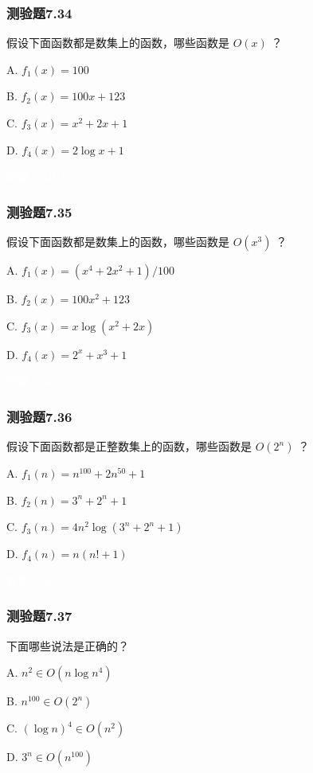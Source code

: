 \documentclass[UTF8, heading=true]{ctexart}
\begin{document}
\subsubsection{测验题7.34}

假设下面函数都是数集上的函数，哪些函数是 $O(x)$ ？

A. $f_1(x)=100$

B. $f_2(x)=100 x+123$

C. $f_3(x)=x^2+2 x+1$

D. $f_4(x)=2 \log x+1$

\textcolor{white}{答案：ABD}

\subsubsection{测验题7.35}

假设下面函数都是数集上的函数，哪些函数是 $O\left(x^3\right)$ ？

A. $f_1(x)=\left(x^4+2 x^2+1\right) / 100$

B. $f_2(x)=100 x^2+123$


C. $f_3(x)=x \log \left(x^2+2 x\right)$

D.  $f_4(x)=2^x+x^3+1$

\textcolor{white}{答案：BC}

\subsubsection{测验题7.36}

假设下面函数都是正整数集上的函数，哪些函数是 $O\left(2^n\right)$ ？

A. $f_1(n)=n^{100}+2 n^{50}+1$

B. $f_2(n)=3^n+2^n+1$

C. $f_3(n)=4 n^2 \log \left(3^n+2^n+1\right)$

D. $f_4(n)=n(n!+1)$

\textcolor{white}{答案：AC}


\subsubsection{测验题7.37}

下面哪些说法是正确的？

A. $ n^2 \in O\left(n \log n^4\right)$

B. $ n^{100} \in O\left(2^n\right)$

C. $(\log n)^4 \in O\left(n^2\right)$

D. $ 3^n \in O\left(n^{100}\right)$
\end{document}
